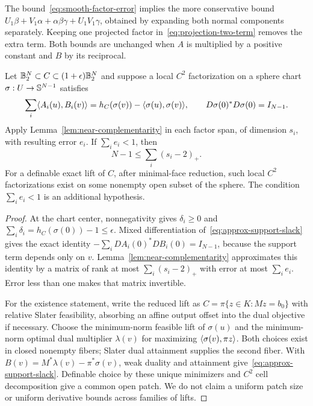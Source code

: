 The bound~\eqref{eq:smooth-factor-error} implies the more conservative
bound $U_1\beta+V_1\alpha+\alpha\beta\gamma+U_1V_1\gamma$, obtained by
expanding both normal components separately. Keeping one
projected factor in~\eqref{eq:projection-two-term} removes the extra
term. Both bounds are unchanged when $A$ is multiplied by a positive
constant and $B$ by its reciprocal.

\begin{theorem}\label{thm:smooth-approximation}
Let $\mathbb B_2^N\subset C\subset(1+\epsilon)\mathbb B_2^N$ and suppose a local
$C^2$ factorization on a sphere chart $\sigma:U\to\mathbb S^{N-1}$ satisfies
\begin{equation}\label{eq:approx-support-slack}
 \sum_i\langle A_i(u),B_i(v)\rangle
 =h_C(\sigma(v))-\langle \sigma(u),\sigma(v)\rangle,\qquad
 D\sigma(0)^*D\sigma(0)=I_{N-1}.
\end{equation}
Apply Lemma~\ref{lem:near-complementarity} in each factor span, of
dimension $s_i$, with resulting error $e_i$. If $\sum_i e_i<1$, then
\[
 N-1\leq\sum_i(s_i-2)_+.
\]
For a definable exact lift of $C$, after minimal-face reduction, such
local $C^2$ factorizations exist on some nonempty open subset of the
sphere. The condition $\sum_i e_i<1$ is an additional hypothesis.
\end{theorem}
\begin{proof}
At the chart center, nonnegativity gives $\delta_i\geq0$ and
$\sum_i\delta_i=h_C(\sigma(0))-1\leq\epsilon$.
Mixed differentiation of~\eqref{eq:approx-support-slack} gives the exact
identity $-\sum_iDA_i(0)^*DB_i(0)=I_{N-1}$, because the support term
depends only on $v$. Lemma~\ref{lem:near-complementarity} approximates
this identity by a matrix of rank at most $\sum_i(s_i-2)_+$ with
error at most $\sum_i e_i$. Error less than one makes that matrix
invertible.

For the existence statement, write the reduced lift as
$C=\pi\{z\in K:Mz=b_0\}$ with relative Slater feasibility, absorbing
an affine output offset into the dual objective if necessary. Choose
the minimum-norm feasible lift of $\sigma(u)$ and the minimum-norm
optimal dual multiplier $\lambda(v)$ for maximizing
$\langle \sigma(v),\pi z\rangle$. Both choices exist in closed nonempty fibers;
Slater dual attainment supplies the second fiber. With
$B(v)=M^*\lambda(v)-\pi^*\sigma(v)$, weak duality and attainment
give~\eqref{eq:approx-support-slack}. Definable choice by these unique
minimizers and $C^2$ cell decomposition give a common open patch.
We do not claim a uniform patch size or uniform derivative bounds
across families of lifts.
\end{proof}

